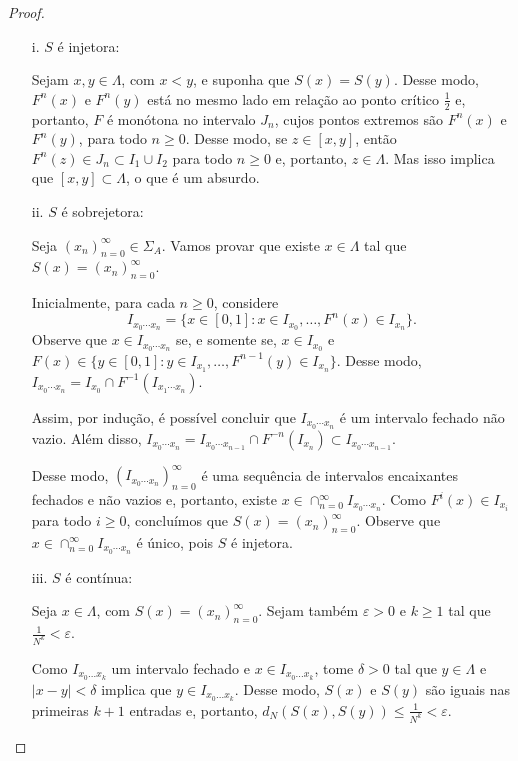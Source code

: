 \begin{proof}

\begin{enumerate}

\item[i.] $S$ é injetora:

Sejam $x, y \in \Lambda$, com $x < y$, e suponha que $S(x) = S(y)$. Desse modo, $F^n(x)$ e $F^n(y)$ está no mesmo lado em relação ao ponto crítico $\frac{1}{2}$ e, portanto, $F$ é monótona no intervalo $J_n$, cujos pontos extremos são $F^n(x)$ e $F^n(y)$, para todo $n \geq 0$. Desse modo, se $z \in [x, y]$, então $F^n(z) \in J_n \subset I_1 \cup I_2$ para todo $n \geq 0$ e, portanto, $z \in \Lambda$. Mas isso implica que $[x, y] \subset \Lambda$, o que é um absurdo.

\item[ii.] $S$ é sobrejetora:

Seja $(x_n)_{n=0}^\infty \in \Sigma_A$. Vamos provar que existe $x \in \Lambda$ tal que $S(x) = (x_n)_{n=0}^\infty$.

Inicialmente, para cada $n \geq 0$, considere
$$I_{x_0 \cdots x_n} = \{ x \in [0,1] : x \in I_{x_0}, \dots, F^n(x) \in I_{x_n} \}.$$
Observe que $x \in I_{x_0 \cdots x_n}$ se, e somente se, $x \in I_{x_0}$ e $F(x) \in \{ y \in [0,1] : y \in I_{x_1}, \dots, F^{n-1}(y) \in I_{x_n} \}$. Desse modo, $I_{x_0 \cdots x_n} = I_{x_0} \cap F^{-1}(I_{x_1 \cdots x_n})$.

Assim, por indução, é possível concluir que $I_{x_0 \cdots x_n}$ é um intervalo fechado não vazio. Além disso, $I_{x_0 \cdots x_n} = I_{x_0 \cdots x_{n-1}} \cap F^{-n}(I_{x_n}) \subset I_{x_0 \cdots x_{n-1}}$.

Desse modo, $(I_{x_0 \cdots x_n})_{n=0}^\infty$ é uma sequência de intervalos encaixantes fechados e não vazios e, portanto, existe $x \in \cap_{n=0}^\infty I_{x_0 \cdots x_n}$. Como $F^i(x) \in I_{x_i}$ para todo $i \geq 0$, concluímos que $S(x) = (x_n)_{n=0}^\infty$. Observe que $x \in \cap_{n=0}^\infty I_{x_0 \cdots x_n}$ é único, pois $S$ é injetora.

\item[iii.] $S$ é contínua:

Seja $x \in \Lambda$, com $S(x) = (x_n)_{n=0}^\infty$. Sejam também $\varepsilon > 0$ e $k \geq 1$ tal que $\frac{1}{N^k} < \varepsilon$.

Como $I_{x_0 \dots x_k}$ um intervalo fechado e $x \in I_{x_0 \dots x_k}$, tome $\delta > 0$ tal que $y \in \Lambda$ e $|x-y| < \delta$ implica que $y \in I_{x_0 \dots x_k}$. Desse modo, $S(x)$ e $S(y)$ são iguais nas primeiras $k+1$ entradas e, portanto, $d_N(S(x), S(y)) \leq \frac{1}{N^k} < \varepsilon$.

\end{enumerate}
\end{proof}


